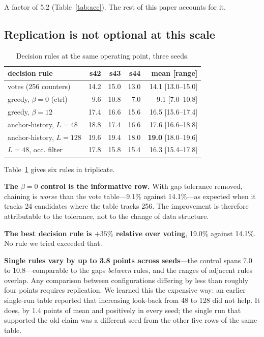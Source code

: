 \documentclass[conference]{IEEEtran}
\begin{document}
A factor of 5.2 (Table~\ref{tab:acc}). The rest of this paper accounts for it.

\subsection{Replication is not optional at this scale}

\begin{table}[t]
\caption{Decision rules at the same operating point, three seeds.}
\label{tab:rules}
\centering
\scriptsize
\begin{tabular}{lrrrr}
\toprule
decision rule & s42 & s43 & s44 & mean [range] \\
\midrule
votes (256 counters)        & 14.2 & 15.0 & 13.0 & 14.1 [13.0--15.0] \\
greedy, $\beta = 0$ (ctrl)  & 9.6 & 10.8 & 7.0 & 9.1 [7.0--10.8] \\
greedy, $\beta = 12$        & 17.4 & 16.6 & 15.6 & 16.5 [15.6--17.4] \\
anchor-history, $L = 48$    & 18.8 & 17.4 & 16.6 & 17.6 [16.6--18.8] \\
anchor-history, $L = 128$   & 19.6 & 19.4 & 18.0 & \textbf{19.0} [18.0--19.6] \\
\quad $L = 48$, occ. filter & 17.8 & 15.8 & 15.4 & 16.3 [15.4--17.8] \\
\bottomrule
\end{tabular}
\end{table}

Table~\ref{tab:rules} gives six rules in triplicate.

\textbf{The $\beta = 0$ control is the informative row.} With gap tolerance removed, chaining is
\emph{worse} than the vote table---9.1\% against 14.1\%---as expected when it tracks 24
candidates where the table tracks 256. The improvement is therefore attributable to the
tolerance, not to the change of data structure.

\textbf{The best decision rule is $+35\%$ relative over voting}, 19.0\% against 14.1\%. No rule
we tried exceeded that.

\textbf{Single rules vary by up to 3.8 points across seeds}---the control spans 7.0 to
10.8---comparable to the gaps \emph{between} rules, and the ranges of adjacent rules overlap. Any
comparison between configurations differing by less than roughly four points requires
replication. We learned this the expensive way: an earlier single-run table reported that
increasing look-back from 48 to 128 did not help. It does, by 1.4 points of mean and positively
in every seed; the single run that supported the old claim was a different seed from the other
five rows of the same table.
\end{document}
